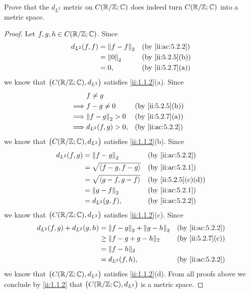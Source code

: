 \begin{ex}\label{ii:ex:5.2.4}
  Prove that the \(d_{L^2}\) metric on \(C(\mathbb{R} / \mathbb{Z} ; \mathbb{C})\) does indeed turn \(C(\mathbb{R} / \mathbb{Z} ; \mathbb{C})\) into a metric space.
\end{ex}

\begin{proof}
  Let \(f, g, h \in C(\mathbb{R} / \mathbb{Z} ; \mathbb{C})\).
  Since
  \begin{align*}
    d_{L^2}(f, f) & = \norm*{f - f}_2 &  & \by{ii:ac:5.2.2} \\
                  & = \norm*{0}_2     &  & \by{ii:5.2.5}[b] \\
                  & = 0,              &  & \by{ii:5.2.7}[a]
  \end{align*}
  we know that \(\big(C(\mathbb{R} / \mathbb{Z} ; \mathbb{C}), d_{L^2}\big)\) satisfies \cref{ii:1.1.2}(a).
  Since
  \begin{align*}
             & f \neq g                                  \\
    \implies & f - g \neq 0        &  & \by{ii:5.2.5}[b] \\
    \implies & \norm*{f - g}_2 > 0 &  & \by{ii:5.2.7}[a] \\
    \implies & d_{L^2}(f, g) > 0,  &  & \by{ii:ac:5.2.2}
  \end{align*}
  we know that \(\big(C(\mathbb{R} / \mathbb{Z} ; \mathbb{C}), d_{L^2}\big)\) satisfies \cref{ii:1.1.2}(b).
  Since
  \begin{align*}
    d_{L^2}(f, g) & = \norm*{f - g}_2              &  & \by{ii:ac:5.2.2}   \\
                  & = \sqrt{\inner*{f - g, f - g}} &  & \by{ii:ac:5.2.1}   \\
                  & = \sqrt{\inner*{g - f, g - f}} &  & \by{ii:5.2.5}[c,d] \\
                  & = \norm*{g - f}_2              &  & \by{ii:ac:5.2.1}   \\
                  & = d_{L^2}(g, f),               &  & \by{ii:ac:5.2.2}
  \end{align*}
  we know that \(\big(C(\mathbb{R} / \mathbb{Z} ; \mathbb{C}), d_{L^2}\big)\) satisfies \cref{ii:1.1.2}(c).
  Since
  \begin{align*}
    d_{L^2}(f, g) + d_{L^2}(g, h) & = \norm*{f - g}_2 + \norm*{g - h}_2 &  & \by{ii:ac:5.2.2} \\
                                  & \geq \norm{f - g + g - h}_2         &  & \by{ii:5.2.7}[c] \\
                                  & = \norm{f - h}_2                                          \\
                                  & = d_{L^2}(f, h),                    &  & \by{ii:ac:5.2.2}
  \end{align*}
  we know that \(\big(C(\mathbb{R} / \mathbb{Z} ; \mathbb{C}), d_{L^2}\big)\) satisfies \cref{ii:1.1.2}(d).
  From all proofs above we conclude by \cref{ii:1.1.2} that \(\big(C(\mathbb{R} / \mathbb{Z} ; \mathbb{C}), d_{L^2}\big)\) is a metric space.
\end{proof}

